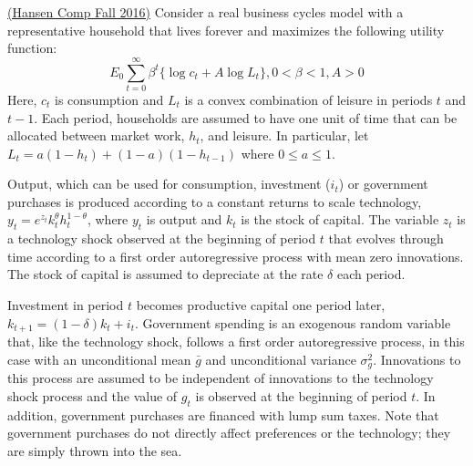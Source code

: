 \documentclass[answers]{exam}
\begin{document}
\begin{questions}
    \question \href{https://economics.ucla.edu/wp-content/uploads/2016/10/macro-f16.pdf}{(Hansen Comp Fall 2016)}
    Consider a real business cycles model with a representative household that lives forever and maximizes the following utility function:
    $$E_0 \sum_{t=0}^{\infty} \beta^t \{ \log{c_t} + A \log{L_t} \}, 0 < \beta < 1, A > 0$$
    Here, $c_t$ is consumption and $L_t$ is a convex combination of leisure in periods $t$ and $t-1$. Each period, households are assumed to have one unit of time that can be allocated between market work, $h_t$, and leisure. In particular, let $L_t = a(1-h_t) + (1-a)(1-h_{t-1})$ where $0 \leq a \leq 1$. 


    Output, which can be used for consumption, investment ($i_t$) or government purchases is produced according to a constant returns to scale technology, $y_t = e^{z_t} k_t^\theta h_t^{1-\theta}$, where $y_t$ is output and $k_t$ is the stock of capital. The variable $z_t$ is a technology shock observed at 
    the beginning of period $t$ that evolves through time according to a first order autoregressive process with mean
    zero innovations. The stock of capital is assumed to depreciate at the rate $\delta$ each period. 


    Investment in period $t$ becomes productive capital one period later, $k_{t+1} = (1-\delta)k_t + i_t$. Government spending is an exogenous random variable that, like the technology shock, follows a first order autoregressive process, in this case with an unconditional mean $\bar{g}$ and unconditional variance $\sigma_g^2$. Innovations to this process are assumed 
    to be independent of innovations to the technology shock process and the value of $g_t$ is observed at the beginning of period $t$. In addition, government purchases are financed with lump sum taxes. Note that government purchases do not directly affect preferences or the technology; they are simply thrown into the sea.
\end{questions}
\end{document}
